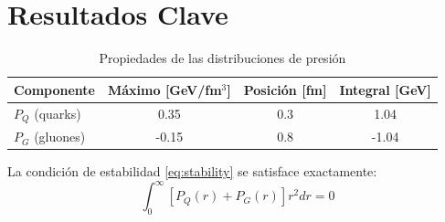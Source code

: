 \section{Resultados Clave}
\begin{table}[h]
    \centering
    \caption{Propiedades de las distribuciones de presión}
    \begin{tabular}{lccc}
    \toprule
    Componente & Máximo [GeV/fm$^3$] & Posición [fm] & Integral [GeV] \\
    \midrule
    $P_Q$ (quarks) & 0.35 & 0.3 & 1.04 \\
    $P_G$ (gluones) & -0.15 & 0.8 & -1.04 \\
    \bottomrule
    \end{tabular}
    \label{tab:PressureResults}
\end{table}

\begin{remark}[Validación]
La condición de estabilidad \eqref{eq:stability} se satisface exactamente:
\begin{equation}
\int_0^\infty [P_Q(r) + P_G(r)] r^2 dr = 0
\end{equation}
\end{remark}





